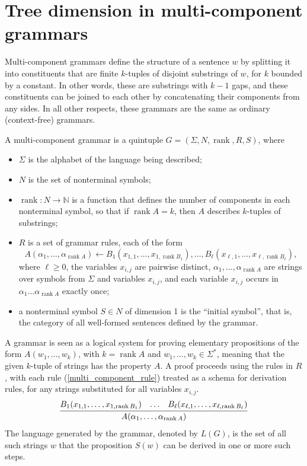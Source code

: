 \documentclass[runningheads]{llncs}
\newcommand{\ranksymb}{\mathop{\mathrm{rank}}}
\newcommand{\rank}[1]{\ranksymb #1}
\begin{document}
\section{Tree dimension in multi-component grammars}\label{section_multi}

Multi-component grammars define the structure of a sentence $w$
by splitting it into constituents that are finite $k$-tuples of disjoint substrings of $w$,
for $k$ bounded by a constant.
In other words, these are substrings with $k-1$ gaps,
and these constituents can be joined to each other
by concatenating their components from any sides.
In all other respects, these grammars are the same as ordinary (context-free) grammars.

\begin{definition}
\label{multi_definition}
A multi-component grammar is a quintuple
$G=(\Sigma, N, \ranksymb, R, S)$,
where
\begin{itemize}
\item
	$\Sigma$ is the alphabet of the language being described;
\item
	$N$ is the set of nonterminal symbols;
\item
	$\ranksymb \colon N \to \mathbb{N}$
	is a function that defines
	the number of components in each nonterminal symbol,
	so that if $\rank{A}=k$,
	then $A$ describes $k$-tuples of substrings;
\item
	$R$ is a set of grammar rules,
	each of the form
	\begin{equation}\tag{*}\label{multi_component_rule}
		A(\alpha_1, \ldots, \alpha_{\rank{A}})
			\leftarrow
		B_1(x_{1,1}, \ldots, x_{1, \rank{B_1}}),
		\ldots,
		B_\ell(x_{\ell,1}, \ldots, x_{\ell, \rank{B_\ell}}),
	\end{equation}
	where $\ell \geqslant 0$,
	the variables $x_{i,j}$ are pairwise distinct,
	$\alpha_1, \ldots, \alpha_{\rank A}$
	are strings over symbols from $\Sigma$ and variables $x_{i,j}$,
	and each variable $x_{i,j}$
	occurs in $\alpha_1 \ldots \alpha_{\rank A}$ exactly once;
\item
	a nonterminal symbol $S \in N$ of dimension 1
	is the ``initial symbol'',
	that is, the category of all well-formed sentences defined by the grammar.
\end{itemize}
A grammar is seen as a logical system
for proving elementary propositions of the form
$A(w_1, \ldots, w_k)$,
with $k=\rank{A}$ and $w_1, \ldots, w_k \in \Sigma^*$,
meaning that the given $k$-tuple of strings has the property $A$.
A proof proceeds using the rules in $R$,
with each rule (\ref{multi_component_rule})
treated as a schema for derivation rules,
for any strings substituted for all variables $x_{i,j}$.
\begin{equation*}
	\infer{A(\alpha_1, \ldots, \alpha_{\rank{A}})}{
		B_1(x_{1,1}, \ldots, x_{1, \rank{B_1}})
		& \ldots &
		B_\ell(x_{\ell,1}, \ldots, x_{\ell, \rank{B_\ell}})
	}
\end{equation*}
The language generated by the grammar,
denoted by $L(G)$,
is the set of all such strings $w$
that the proposition $S(w)$
can be derived in one or more such steps.


\end{definition}
\end{document}
